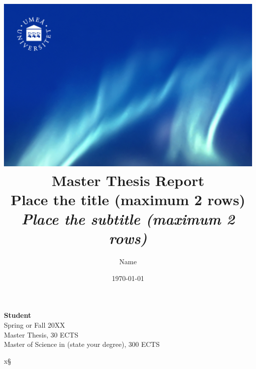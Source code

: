 \documentclass[a4paper,table]{article}
\title{
    \includegraphics[width=1\textwidth]{front.jpg} \\
    \vspace{0.7cm}
     Master Thesis Report\\
    \vspace{0.6cm}
    \LARGE Place the title (maximum 2 rows)\\ %
    \vspace{0.7cm}
    \large\textit{Place the subtitle (maximum 2 rows)}
    \vspace{0.8cm}
}
\author{
    Name\\
}
\date{\today}
\begin{document}
\pretitle{\begin{flushleft} \georgia \fontsize{30}{34}\selectfont}
\posttitle{\end{flushleft}}
\preauthor{\begin{flushleft} \georgia \linespread{1.4} \large}
\postauthor{\end{flushleft}}
\predate{} %
\postdate{} %

\maketitle
\vfill
\begin{flushleft}
    \small
    \textbf{Student} \\
    Spring or Fall 20XX \\
    Master Thesis, 30 ECTS\\
    Master of Science in (state your degree), 300 ECTS
\end{flushleft}
x§
\thispagestyle{empty}
\restoregeometry
\end{document}
